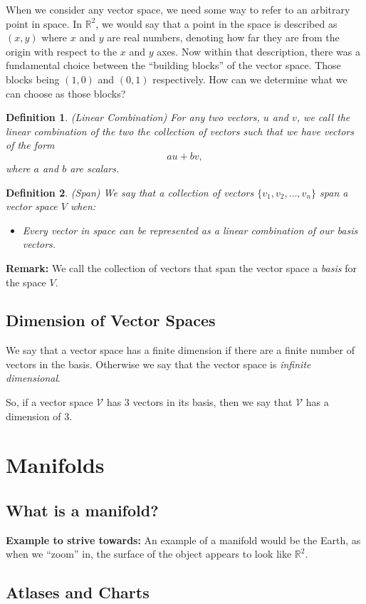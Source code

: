 \documentclass{article}
\newtheorem{definition}{Definition}
\begin{document}
When we consider any vector space, we need some way to refer to an arbitrary point in space. In $\mathbb{R}^2$, we would say that a point in the space is described as $(x,y)$ where $x$ and $y$ are real numbers, denoting how far they are from the origin with respect to the $x$ and $y$ axes. Now within that description, there was a fundamental choice between the ``building blocks'' of the vector space. Those blocks being $(1,0)$ and $(0,1)$ respectively. How can we determine what we can choose as those blocks? 
\begin{definition}
		(Linear Combination) For any two vectors, $u$ and $v$, we call the linear combination of the two the collection of vectors such that we have vectors of the form \[au+bv,\] where $a$ and $b$ are scalars.
\end{definition}	
\begin{definition}
		(Span) We say that a collection of vectors $\{v_1,v_2,\dots,v_n\}$ span a vector space $V$ when:
		\begin{itemize}
				\item Every vector in space can be represented as a linear combination of our basis vectors. 
		\end{itemize}	
\end{definition}	
\textbf{Remark:} We call the collection of vectors that span the vector space a \emph{basis} for the space $V$. 
\subsection{Dimension of Vector Spaces}
We say that a vector space has a finite dimension if there are a finite number of vectors in the basis. Otherwise we say that the vector space is \emph{infinite dimensional}.

So, if a vector space $\mathcal{V}$  has $3$ vectors in its basis, then we say that $\mathcal{V}$ has a dimension of $3$.  

\section{Manifolds}
\subsection{What is a manifold?}

\textbf{Example to strive towards:} An example of a manifold would be the Earth, as when we ``zoom'' in, the surface of the object appears to look like $\mathbb R^2$.
\subsection{Atlases and Charts}
\end{document}
